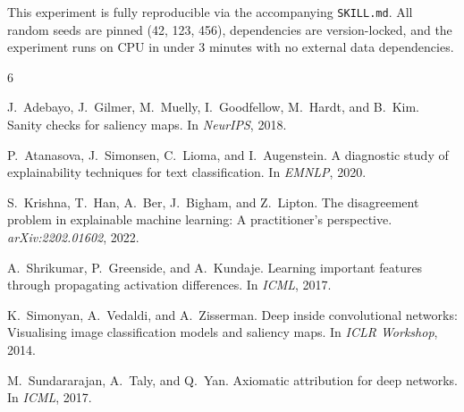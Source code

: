 \documentclass[11pt,a4paper]{article}
\begin{document}
This experiment is fully reproducible via the accompanying \texttt{SKILL.md}. All random seeds are pinned (42, 123, 456), dependencies are version-locked, and the experiment runs on CPU in under 3 minutes with no external data dependencies.


\begin{thebibliography}{6}

J.~Adebayo, J.~Gilmer, M.~Muelly, I.~Goodfellow, M.~Hardt, and B.~Kim.
\newblock Sanity checks for saliency maps.
\newblock In \emph{NeurIPS}, 2018.

P.~Atanasova, J.~Simonsen, C.~Lioma, and I.~Augenstein.
\newblock A diagnostic study of explainability techniques for text classification.
\newblock In \emph{EMNLP}, 2020.

S.~Krishna, T.~Han, A.~Ber, J.~Bigham, and Z.~Lipton.
\newblock The disagreement problem in explainable machine learning: A practitioner's perspective.
\newblock \emph{arXiv:2202.01602}, 2022.

A.~Shrikumar, P.~Greenside, and A.~Kundaje.
\newblock Learning important features through propagating activation differences.
\newblock In \emph{ICML}, 2017.

K.~Simonyan, A.~Vedaldi, and A.~Zisserman.
\newblock Deep inside convolutional networks: Visualising image classification models and saliency maps.
\newblock In \emph{ICLR Workshop}, 2014.

M.~Sundararajan, A.~Taly, and Q.~Yan.
\newblock Axiomatic attribution for deep networks.
\newblock In \emph{ICML}, 2017.

\end{thebibliography}
\end{document}
